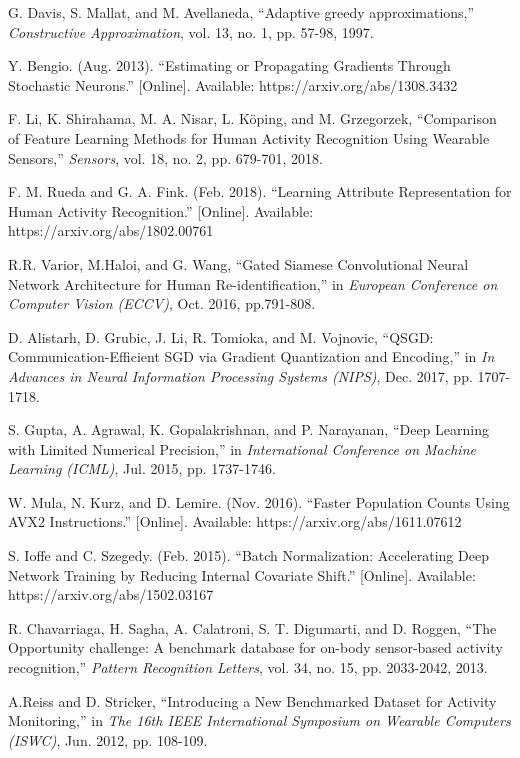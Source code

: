 \documentclass[twoside,twocolumn]{article}
\begin{document}
\begin{thebibliography}{00}
 G. Davis, S. Mallat, and M. Avellaneda, ``Adaptive greedy approximations,'' \emph{Constructive Approximation}, vol. 13, no. 1, pp. 57-98, 1997.

 Y. Bengio. (Aug. 2013). ``Estimating or Propagating Gradients Through Stochastic Neurons.'' [Online]. Available: https://arxiv.org/abs/1308.3432

 F. Li, K. Shirahama, M. A. Nisar, L. K\"oping, and M. Grzegorzek, ``Comparison of Feature Learning Methods for Human Activity Recognition Using Wearable Sensors,'' \emph{Sensors}, vol. 18, no. 2, pp. 679-701, 2018.

 F. M. Rueda and G. A. Fink. (Feb. 2018). ``Learning Attribute Representation for Human Activity Recognition.'' [Online]. Available: https://arxiv.org/abs/1802.00761

 R.R. Varior, M.Haloi, and G. Wang, ``Gated Siamese Convolutional Neural Network Architecture for Human Re-identification,'' in \emph{European Conference on Computer Vision (ECCV)}, Oct. 2016, pp.791-808.

 D. Alistarh, D. Grubic, J. Li, R. Tomioka, and M. Vojnovic, ``QSGD: Communication-Efficient SGD via Gradient Quantization and Encoding,'' in \emph{In Advances in Neural Information Processing Systems (NIPS)}, Dec. 2017, pp. 1707-1718.

 S. Gupta, A. Agrawal, K. Gopalakrishnan, and P. Narayanan, ``Deep Learning with Limited Numerical Precision,'' in \emph{International Conference on Machine Learning (ICML)}, Jul. 2015, pp. 1737-1746.

 W. Mula, N. Kurz, and D. Lemire. (Nov. 2016). ``Faster Population Counts Using AVX2 Instructions.'' [Online]. Available: https://arxiv.org/abs/1611.07612

 S. Ioffe and C. Szegedy. (Feb. 2015). ``Batch Normalization: Accelerating Deep Network Training by Reducing Internal Covariate Shift.'' [Online]. Available: https://arxiv.org/abs/1502.03167

 R. Chavarriaga, H. Sagha, A. Calatroni, S. T. Digumarti, and D. Roggen, ``The Opportunity challenge: A benchmark database for on-body sensor-based activity recognition,'' \emph{Pattern Recognition Letters}, vol. 34, no. 15, pp. 2033-2042, 2013.

 A.Reiss and D. Stricker, ``Introducing a New Benchmarked Dataset for Activity Monitoring,'' in \emph{The 16th IEEE International Symposium on Wearable Computers (ISWC)}, Jun. 2012, pp. 108-109.


\end{thebibliography}
\end{document}
